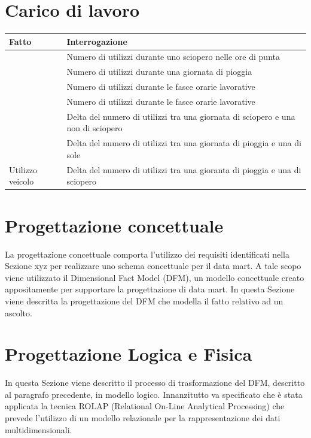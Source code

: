 \section{Carico di lavoro}
\begin{table}[h]
\centering
\begin{tabular}{|l|l|}
\hline
\rowcolor[HTML]{3166FF} 
{\color[HTML]{FFFFFF} \textbf{Fatto}} & {\color[HTML]{FFFFFF} \textbf{Interrogazione}}                                  \\ \hline
                                      & Numero di utilizzi durante uno sciopero nelle ore di punta                      \\ \cline{2-2} 
                                      & Numero di utilizzi durante una giornata di pioggia                              \\ \cline{2-2} 
                                      & Numero di utilizzi durante le fasce orarie lavorative                           \\ \cline{2-2} 
                                      & Numero di utilizzi durante le fasce orarie lavorative                           \\ \cline{2-2} 
                                      & Delta del numero di utilizzi tra una giornata di sciopero e una non di sciopero \\ \cline{2-2} 
                                      & Delta del numero di utilizzi tra una giornata di pioggia e una di sole          \\ \cline{2-2} 
\multirow{-7}{*}{Utilizzo veicolo}    & Delta del numero di utilizzi tra una gioranta di pioggia e una di sciopero      \\ \hline
\end{tabular}
\end{table}
\section{Progettazione concettuale}
La progettazione concettuale comporta l’utilizzo dei requisiti identificati nella Sezione xyz
per realizzare uno schema concettuale per il data mart. A tale scopo viene utilizzato il
Dimensional Fact Model (DFM), un modello concettuale creato appositamente per supportare la progettazione di data mart. 
In questa Sezione viene descritta la progettazione del DFM che modella il fatto relativo ad un ascolto.

\section{Progettazione Logica e Fisica}
In questa Sezione viene descritto il processo di trasformazione del DFM, descritto al paragrafo precedente, in modello logico. 
Innanzitutto va specificato che è stata applicata la tecnica ROLAP (Relational On-Line Analytical Processing) che prevede l’utilizzo di un
modello relazionale per la rappresentazione dei dati multidimensionali.
